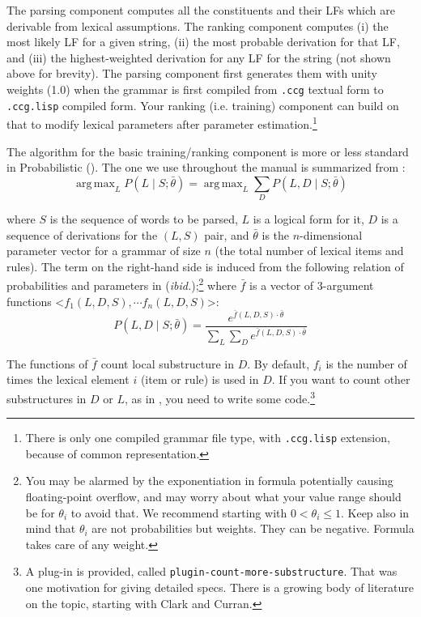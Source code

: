 \documentclass[11pt]{article}
\DeclareMathOperator*{\argmax}{arg\,max}
\begin{document}
\noindent The parsing component computes all the constituents and their LFs which are derivable from lexical assumptions.
The ranking component computes (i) the most likely LF for a given string, (ii) the most probable derivation for that LF,
and (iii) the highest-weighted derivation for any LF for the string (not shown above for brevity).  The parsing component first generates them with unity weights (1.0) when the grammar is first compiled from \verb+.ccg+ textual form to \verb+.ccg.lisp+ compiled form. 
Your ranking (i.e. training) component can build on that to modify  lexical parameters after parameter estimation.\footnote{There is only one compiled grammar file type, with \verb+.ccg.lisp+ extension, because of common representation.} 

The algorithm for the basic training/ranking component is more or less standard  in Probabilistic  (). The one we
use  throughout the manual is summarized from \cite{zettlemoyercollins05}:
\begin{equation}
\label{rul:argmax}
\argmax_L P(L\mid S;\bar{\theta}) = \argmax_L \sum_D P(L, D\mid S;\bar{\theta})
\end{equation}

\noindent where $S$ is the sequence of words to be parsed, $L$ is a logical form for it, $D$ is a sequence of  derivations for the $(L,S)$ pair, and $\bar{\theta}$
is the $n$-dimensional parameter vector for a grammar of size $n$ (the total number of lexical items and rules).
The term on the right-hand side is induced from the following relation of probabilities and parameters in  
(\emph{ibid.});\footnote{You may be alarmed by the exponentiation in formula potentially causing floating-point
overflow, and may worry about what your value range should be for ${\theta}_i$ to avoid that. 
We recommend starting with $0<\theta_i\le 1$. Keep also in mind that $\theta_i$ are not probabilities but weights.
They can be negative. Formula takes care of any weight.
}
 where $\bar{f}$ is a vector of 3-argument functions <${f}_1(L,D,S),\cdots {f}_n(L,D,S)$>:
\begin{equation}
\label{rul:prob}
 P(L,D\mid S;\bar{\theta}) = {\displaystyle\dfrac{e^{\bar{f}(L, D, S)\cdot\bar{\theta}}}
{\sum\limits_{L}\sum\limits_{D} e^{\bar{f}(L, D, S)\cdot\bar{\theta}}}}
\end{equation}

 
\noindent The functions of $\bar{f}$ count local substructure in $D$. By default, ${f}_i$ is the number of times the lexical element   $i$ (item or rule) is used in $D$. If you want to count other substructures in $D$  or $L$, as in \cite{clar:03}, you need to write some code.\footnote{A plug-in is provided, called \verb+plugin-count-more-substructure+.
That was one motivation for giving detailed specs. There is a growing body of literature on the topic, starting with
Clark and Curran.}
\end{document}
